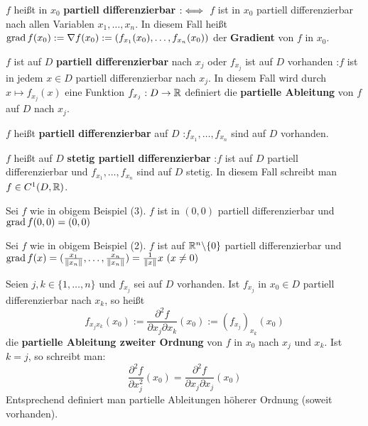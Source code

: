 \documentclass[a4paper,twoside,DIV15,BCOR12mm,chapterprefix=true,headings=twolinechapter]{scrbook}
\begin{document}
\def\grad{\mathop{\rm grad}\nolimits}
\begin{definition}
\begin{liste}
\item $f$ heißt in $x_0$ \textbf{partiell differenzierbar} $:\iff$ $f$ ist in $x_0$ 
partiell differenzierbar nach allen Variablen $x_1,\ldots, x_n$. In diesem Fall heißt 
$\grad f(x_0) := \nabla f(x_0) := (f_{x_1}(x_0),\ldots, f_{x_n}(x_0))$ der \textbf{Gradient} von 
$f$ in $x_0$. 
\item $f$ ist auf $D$ \textbf{partiell differenzierbar} nach $x_j$ oder $f_{x_j}$ ist auf $D$ vorhanden :\equizu $f$ ist in jedem $x\in D$ partiell differenzierbar nach $x_j$. In diesem Fall wird durch $x\mapsto f_{x_j}(x)$ eine Funktion $f_{x_j}: D\to \mathbb{R}$ definiert die \textbf{partielle Ableitung} von $f$ auf $D$ nach $x_j$.
\item $f$ heißt \textbf{partiell differenzierbar} auf $D$ :\equizu $f_{x_1},\ldots,f_{x_n}$ sind auf $D$ vorhanden.
\item $f$ heißt auf $D$ \textbf{stetig partiell differenzierbar} :\equizu $f$ ist auf $D$ partiell differenzierbar und $f_{x_1},\ldots,f_{x_n}$ sind auf $D$ stetig. In diesem Fall schreibt man $f\in C^1(D,\mathbb{R})$.
\end{liste}
\end{definition}

\begin{beispiele}
\item Sei $f$ wie in obigem Beispiel (3). $f$ ist in $(0,0)$ partiell differenzierbar und $\grad f(0,0) = (0,0)$
\item Sei $f$ wie in obigem Beispiel (2). $f$ ist auf $\mathbb{R}^n\backslash\{0\}$ partiell differenzierbar und $\grad f(x) = (\frac{x_1}{\|x_n\|},\ldots,\frac{x_n}{\|x_n\|}) = \frac{1}{\|x\|} x \ (x\ne 0)$
\end{beispiele}

\begin{definition}
Seien $j,k\in\{1,\ldots,n\}$ und $f_{x_j}$ sei auf $D$ vorhanden. Ist $f_{x_j}$ in 
$x_0\in D$ partiell differenzierbar nach $x_k$, so heißt 
$$f_{x_jx_k}(x_0) := \frac{\partial^2 f}{\partial x_j\partial x_k}(x_0) := \left(f_{x_j}\right)_{x_k}(x_0)$$ 
die \textbf{partielle Ableitung zweiter Ordnung} von $f$ in $x_0$ nach $x_j$ und $x_k$. Ist $k=j$, so schreibt man:
$$\frac{\partial^2 f}{\partial x_j^2}(x_0) = \frac{\partial^2 f}{\partial x_j\partial x_j}(x_0) $$ Entsprechend definiert man partielle Ableitungen höherer Ordnung (soweit vorhanden).
\end{definition}
\end{document}
